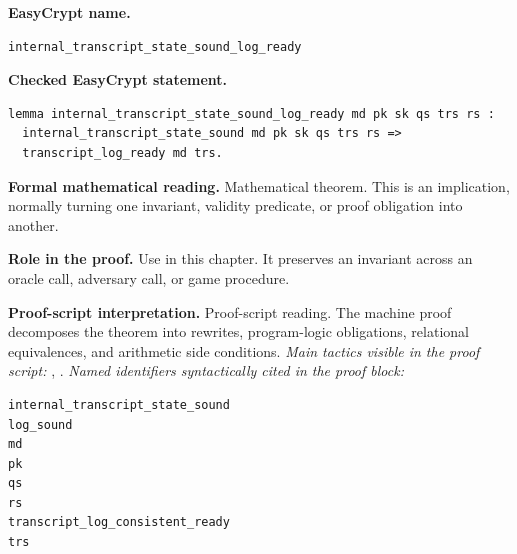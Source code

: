 \begin{formaltheorem}
\noindent\textbf{EasyCrypt name.}
\begin{lstlisting}[language=EasyCrypt,basicstyle=\ttfamily\scriptsize]
internal_transcript_state_sound_log_ready
\end{lstlisting}
\noindent\textbf{Checked EasyCrypt statement.}
\begin{lstlisting}[language=EasyCrypt,basicstyle=\ttfamily\scriptsize]
lemma internal_transcript_state_sound_log_ready md pk sk qs trs rs :
  internal_transcript_state_sound md pk sk qs trs rs =>
  transcript_log_ready md trs.
\end{lstlisting}
\noindent\textbf{Formal mathematical reading.}
Mathematical theorem. This is an implication, normally turning one invariant, validity predicate, or proof obligation into another.

\noindent\textbf{Role in the proof.}
Use in this chapter. It preserves an invariant across an oracle call, adversary call, or game procedure.

\noindent\textbf{Proof-script interpretation.}
Proof-script reading. The machine proof decomposes the theorem into rewrites, program-logic obligations, relational equivalences, and arithmetic side conditions.
\emph{Main tactics visible in the proof script:} , .
\emph{Named identifiers syntactically cited in the proof block:}
\begin{lstlisting}[language=EasyCrypt,basicstyle=\ttfamily\scriptsize]
internal_transcript_state_sound
log_sound
md
pk
qs
rs
transcript_log_consistent_ready
trs
\end{lstlisting}

\end{formaltheorem}

